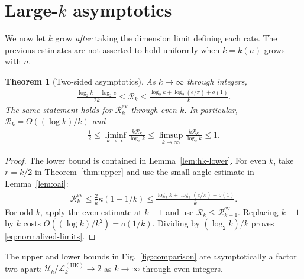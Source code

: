 \documentclass[pdflatex,sn-mathphys-num]{sn-jnl}
\theoremstyle{thmstyleone}
\newtheorem{theorem}{Theorem}[section]
\theoremstyle{thmstyletwo}
\newcommand{\Rrate}{\mathcal{R}}
\newcommand{\Urate}{\mathcal{U}}
\newcommand{\Lrate}{\mathcal{L}}
\newcommand{\ev}{\mathrm{ev}}
\newcommand{\HK}{\mathrm{HK}}
\begin{document}

\section{Large-\texorpdfstring{$k$}{k} asymptotics}
\label{sec:asymptotics}

We now let $k$ grow \emph{after} taking the dimension limit defining each rate. The previous estimates are not asserted to hold uniformly when $k=k(n)$ grows with $n$.

\begin{theorem}[Two-sided asymptotics]\label{thm:asymptotics}
As $k\to\infty$ through integers,
\begin{align}\label{eq:two-sided-asymptotics}
 \frac{\log_2k-\log_2e}{2k}
 \le\Rrate_k\le
 \frac{\log_2k+\log_2(e/\pi)+o(1)}{k}.
\end{align}
The same statement holds for $\Rrate^{\ev}_k$ through even $k$. In particular, $\Rrate_k=\Theta((\log k)/k)$ and
\begin{align}\label{eq:normalized-limits}
 \frac12\le\liminf_{k\to\infty}\frac{k\Rrate_k}{\log_2k}
 \le\limsup_{k\to\infty}\frac{k\Rrate_k}{\log_2k}\le1.
\end{align}
\end{theorem}
\begin{proof}
The lower bound is contained in Lemma~\ref{lem:hk-lower}. For even $k$, take $r=k/2$ in Theorem~\ref{thm:upper} and use the small-angle estimate in Lemma~\ref{lem:oai}:
\begin{align}
 \Rrate^{\ev}_k\le\frac2k\kappa(1-1/k)
 \le\frac{\log_2k+\log_2(e/\pi)+o(1)}{k}.
\end{align}
For odd $k$, apply the even estimate at $k-1$ and use $\Rrate_k\le\Rrate^{\ev}_{k-1}$. Replacing $k-1$ by $k$ costs $O((\log k)/k^2)=o(1/k)$. Dividing by $(\log_2k)/k$ proves \eqref{eq:normalized-limits}.\qedhere
\end{proof}

The upper and lower bounds in Fig.~\ref{fig:comparison} are asymptotically a factor two apart: $\Urate_k/\Lrate_k^{(\HK)}\to2$ as $k\to\infty$ through even integers.
\end{document}
